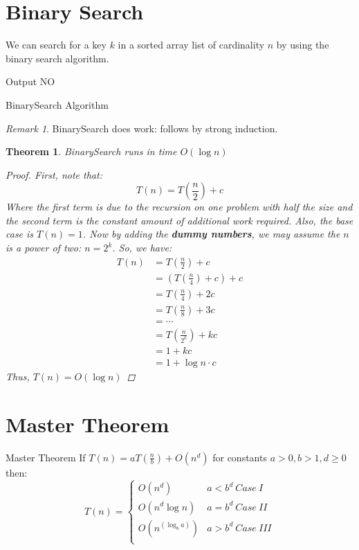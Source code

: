\documentclass[11pt, a4paper, oneside]{book}
\DeclarePairedDelimiter\ceil{\lceil}{\rceil}
\theoremstyle{theoremdd}
\newtheorem{theorem}{Theorem}[chapter]
\theoremstyle{remark}
\newtheorem*{remark}{Remark}
\begin{document}
\section{Binary Search}
We can search for a key $k$ in a sorted array list of cardinality $n$ by using the binary search algorithm. 

\begin{algorithm}[H]
\SetAlgoLined
{}
	Output NO\;
\caption{BinarySearch Algorithm}
\end{algorithm}

\begin{remark}
BinarySearch does work: follows by strong induction.
\end{remark}

\begin{theorem}
BinarySearch runs in time $O(\log n)$
\begin{proof}
First, note that: 
\begin{equation*}
T(n) = T(\frac{n}{2}) + c 
\end{equation*}
Where the first term is due to the recursion on one problem with half the size and the second term is the constant amount of additional work required. Also, the base case is $T(n)=1$. Now by adding the \textbf{dummy numbers}, we may assume the $n$ is a power of two: $n=2^k$. So, we have: 
\begin{align*}
T(n) & = T(\frac{n}{2}) + c \\&
	   = (T(\frac{n}{4}) + c) + c \\&
	   = T(\frac{n}{4}) + 2c \\&
	   = T(\frac{n}{8}) + 3c \\&
	   = \cdots \\&
	   = T(\frac{n}{2^k}) + kc \\&
	   = 1 + kc \\& 
	   = 1 + \log n \cdot c
\end{align*}
Thus, $T(n) = O(\log n)$
\end{proof}
\end{theorem}

\section{Master Theorem}
\begin{mytheo}{Master Theorem}{}
If $T(n) = aT(\frac{n}{b}) + O(n^d)$ for constants $a>0, b>1, d\geq 0$ then: 
\[
  T(n)=\begin{cases}
               O(n^d)         	& a<b^d \ Case\ I \\
               O(n^d\log n)   	& a=b^d \ Case\ II\\
               O(n^(\log_b a))  & a>b^d \ Case\ III\\
            \end{cases}
\]
\end{mytheo}
\end{document}
